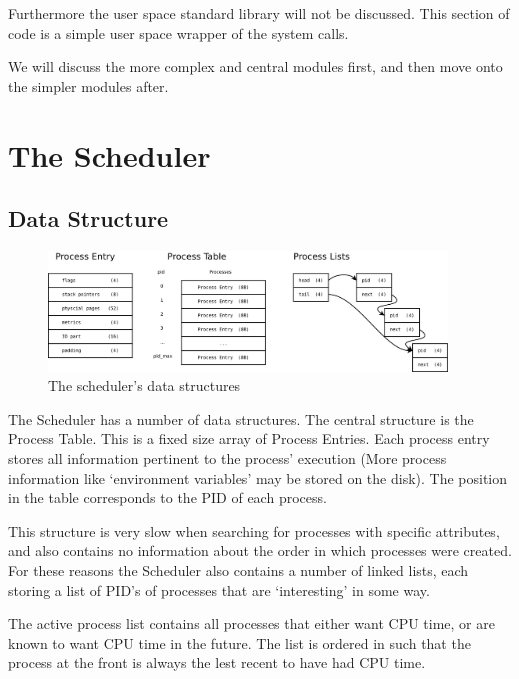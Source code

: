 \documentclass[a4paper]{report}
\begin{document}
Furthermore the user space standard library will not be discussed. This section of code is a simple user space wrapper of the system calls.

We will discuss the more complex and central modules first, and then move onto the simpler modules after.
















\clearpage

\section{The Scheduler}


\subsection{Data Structure}

\begin{figure}[ht]
\centering
\includegraphics[width=400px]{images/Scheduler_Structure}
\caption{The scheduler's data structures}
\label{fig:WinTitleBarScreen}
\end{figure}


The Scheduler has a number of data structures. The central structure is the Process Table. This is a fixed size array of Process Entries. Each process entry stores all information pertinent to the process' execution (More process information like `environment variables' may be stored on the disk). The position in the table corresponds to the PID of each process.

This structure is very slow when searching for processes with specific attributes, and also contains no information about the order in which processes were created. For these reasons the Scheduler also contains a number of linked lists, each storing a list of PID's of processes that are `interesting' in some way.

The active process list contains all processes that either want CPU time, or are known to want CPU time in the future. The list is ordered in such that the process at the front is always the lest recent to have had CPU time.
\end{document}
